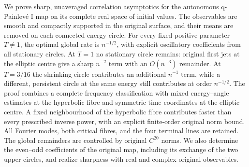 We prove sharp, unaveraged correlation asymptotics for the autonomous
q-Painlev\'e I map on its complete real space of initial values.
The observables are smooth and compactly supported in the original
surface, and their means are removed on each connected energy circle.
For every fixed positive parameter $T\ne1$, the optimal global rate
is $n^{-1/2}$, with explicit oscillatory coefficients from all stationary
circles. At $T=1$ no stationary circle remains: original first jets
at the elliptic centre give a sharp $n^{-2}$ term with an
$O(n^{-3})$ remainder. At $T=3/16$ the shrinking circle contributes
an additional $n^{-1}$ term, while a different, persistent circle at
the same energy still contributes at order $n^{-1/2}$.
The proof combines a complete frequency classification with mixed
energy--angle estimates at the hyperbolic fibre and symmetric time
coordinates at the elliptic centre. A fixed neighbourhood of the
hyperbolic fibre contributes faster than every prescribed inverse
power, with an explicit finite-order original norm bound. All Fourier
modes, both critical fibres, and the four terminal lines are retained.
The global remainders are controlled by original $C^{20}$ norms.
We also determine the even--odd coefficients of the original map,
including its exchange of the two upper circles, and realize sharpness
with real and complex original observables.
